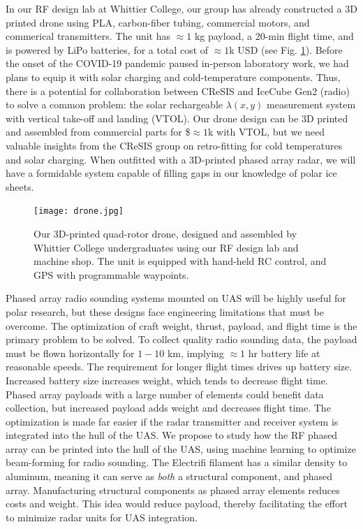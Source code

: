 \documentclass[../../main.tex]{subfiles}
\begin{document}
In our RF design lab at Whittier College, our group has already constructed a 3D printed drone using PLA, carbon-fiber tubing, commercial motors, and commerical transmitters.  The unit has $\approx 1$ kg payload, a 20-min flight time, and is powered by LiPo batteries, for a total cost of $\approx 1$k USD (see Fig. \ref{fig:drone}).  Before the onset of the COVID-19 pandemic paused in-person laboratory work, we had plans to equip it with solar charging and cold-temperature components.  Thus, there is a potential for collaboration between CReSIS and IceCube Gen2 (radio) to solve a common problem: the solar rechargeable $\lambda(x,y)$ measurement system with vertical take-off and landing (VTOL).  Our drone design can be 3D printed and assembled from commercial parts for \$$\approx1$k with VTOL, but we need valuable insights from the CReSIS group on retro-fitting for cold temperatures and solar charging.  When outfitted with a 3D-printed phased array radar, we will have a formidable system capable of filling gaps in our knowledge of polar ice sheets.  \\ \vspace{2.5mm}

\begin{figure}
\centering
\texttt{[image: drone.jpg]}
\caption{\label{fig:drone} Our 3D-printed quad-rotor drone, designed and assembled by Whittier College undergraduates using our RF design lab and machine shop.  The unit is equipped with hand-held RC control, and GPS with programmable waypoints.}
\end{figure}

Phased array radio sounding systems mounted on UAS will be highly useful for polar research, but these designs face engineering limitations that must be overcome.  The optimization of craft weight, thrust, payload, and flight time is the primary problem to be solved.  To collect quality radio sounding data, the payload must be flown horizontally for $1-10$ km, implying $\approx 1$ hr battery life at reasonable speeds.  The requirement for longer flight times drives up battery size.  Increased battery size increases weight, which tends to decrease flight time.  Phased array payloads with a large number of elements could benefit data collection, but increased payload adds weight and decreases flight time.  The optimization is made far easier if the radar transmitter and receiver system is integrated into the hull of the UAS.  We propose to study how the RF phased array can be printed into the hull of the UAS, using machine learning to optimize beam-forming for radio sounding.  The Electrifi filament has a similar density to aluminum, meaning it can serve as \textit{both} a structural component, and phased array.  Manufacturing structural components as phased array elements reduces costs and weight.  This idea would reduce payload, thereby facilitating the effort to minimize radar units for UAS integration.  \\ \vspace{2.5mm}
\end{document}
